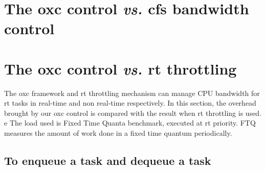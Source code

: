 \section{The oxc control \emph{vs.} cfs bandwidth control}
\section{The oxc control \emph{vs.} rt throttling}
The oxc framework and rt throttling mechanism can manage CPU bandwidth for 
rt tasks in real-time and non real-time respectively. In this section, the 
overhead brought by our oxc control is compared with the result when rt 
throttling is used.
e
The load used is Fixed Time Quanta \cite{ftq} benchmark, executed at rt 
priority. FTQ measures the amount of work done in a fixed time quantum
periodically. 
\subsection{To enqueue a task and dequeue a task}

